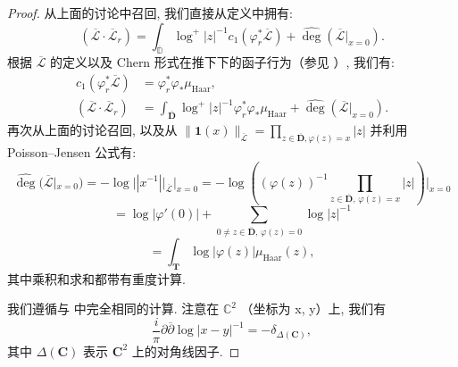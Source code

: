 \begin{proof}
从上面的讨论中召回, 我们直接从定义中拥有:
\[ (\overline{\mathcal{L}} \cdot \overline{\mathcal{L}}_r) = \int_{\overline{\mathbb{D}}} \log^+ |z|^{-1} c_1(\varphi_r^* \overline{\mathcal{L}}) + \widehat{\operatorname{deg}}(\overline{\mathcal{L}}|_{x=0}). \]
根据 \(\overline{\mathcal{L}}\) 的定义以及 Chern 形式在推下下的函子行为（参见 \cite[命题 3.4.5(2)]{BC22}）, 我们有:
\[
\begin{aligned}
c_1(\varphi_r^*\overline{\mathcal{L}}) &= \varphi_r^*\varphi_*\mu_{\mathrm{Haar}}, \\
(\overline{\mathcal{L}}\cdot\overline{\mathcal{L}}_r) &= \int_{\overline{\mathbf{D}}} \log^+|z|^{-1}\varphi_r^*\varphi_*\mu_{\mathrm{Haar}} + \widehat{\deg}(\overline{\mathcal{L}}|_{x=0}).
\end{aligned}
\]
再次从上面的讨论召回, 以及从 \(\|\mathbf{1}(x)\|_{\overline{\mathcal{L}}} = \prod_{z \in \overline{\mathbf{D}}, \varphi(z) = x} |z|\) 
并利用 Poisson--Jensen 公式有:
\[ \widehat{\operatorname{deg}}(\overline{\mathcal{L}}|_{x=0}) = -\log ||x^{-1}||_{\overline{\mathcal{L}}} \Big|_{x=0} = -\log \left( (\varphi(z))^{-1} \prod_{z \in \overline{\mathbf{D}}, \, \varphi(z) = x} |z| \right) \Big|_{x=0} \]
\[ = \log |\varphi'(0)| + \sum_{0 \neq z \in \overline{\mathbf{D}}, \, \varphi(z) = 0} \log |z|^{-1} \]
\[ = \int_{\mathbf{T}} \log |\varphi(z)| \mu_{\mathrm{Haar}}(z), \]
其中乘积和求和都带有重度计算.

我们遵循与 \cite[第 5.4 节和示例 5.3.2.1]{BC22} 中完全相同的计算. 
注意在 \(\mathbb{C}^2\) （坐标为 x, y）上, 我们有
\[ \frac{i}{\pi} \partial \overline{\partial} \log |x - y|^{-1} = -\delta_{\Delta(\mathbf{C})}, \]
其中 \(\Delta(\mathbf{C})\) 表示 \(\mathbf{C}^2\) 上的对角线因子.


\end{proof}
